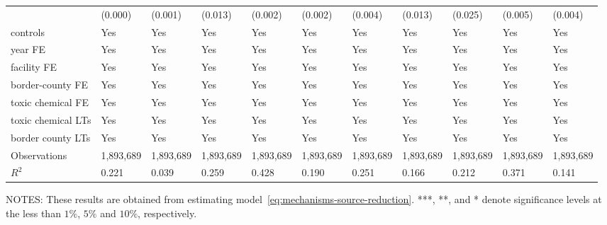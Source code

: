 \begin{table}[H]
{\begin{tabular}{@{}lllllllllll@{}}
            & (0.000)       & (0.001)       & (0.013)        & (0.002)      & (0.002)        & (0.004)   & (0.013)                      & (0.025)          & (0.005)               & (0.004)          \\
            controls           & Yes           & Yes           & Yes            & Yes          & Yes            & Yes       & Yes                          & Yes              & Yes                   & Yes              \\
            year FE            & Yes           & Yes           & Yes            & Yes          & Yes            & Yes       & Yes                          & Yes              & Yes                   & Yes              \\
            facility FE        & Yes           & Yes           & Yes            & Yes          & Yes            & Yes       & Yes                          & Yes              & Yes                   & Yes              \\
            border-county FE   & Yes           & Yes           & Yes            & Yes          & Yes            & Yes       & Yes                          & Yes              & Yes                   & Yes              \\
            toxic chemical FE  & Yes           & Yes           & Yes            & Yes          & Yes            & Yes       & Yes                          & Yes              & Yes                   & Yes              \\
            toxic chemical LTs & Yes           & Yes           & Yes            & Yes          & Yes            & Yes       & Yes                          & Yes              & Yes                   & Yes              \\
            border county LTs  & Yes           & Yes           & Yes            & Yes          & Yes            & Yes       & Yes                          & Yes              & Yes                   & Yes              \\\midrule
            Observations       & 1,893,689     & 1,893,689     & 1,893,689      & 1,893,689    & 1,893,689      & 1,893,689 & 1,893,689                    & 1,893,689        & 1,893,689             & 1,893,689        \\
            $R^2$              & 0.221         & 0.039         & 0.259          & 0.428        & 0.190          & 0.251     & 0.166                        & 0.212            & 0.371                 & 0.141            \\ \bottomrule \bottomrule
        \end{tabular}%
    }
    \begin{minipage}{\columnwidth}
        \vspace{0.05in}
        \tiny NOTES: These results are obtained from estimating model~\ref{eq:mechanisms-source-reduction}. ***, **, and * denote significance levels at the less than $1\%$, $5\%$ and $10\%$, respectively.
    \end{minipage}
\end{table}